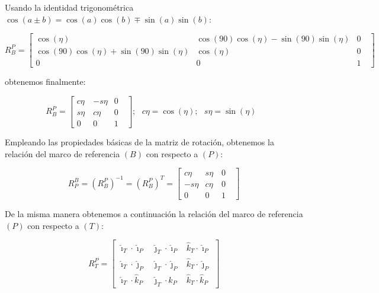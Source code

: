 Usando la identidad trigonom\'{e}trica $\cos (a\pm b)=\cos (a)\cos (b)\mp \sin
(a)\sin (b)$:

\begin{equation*}
R_{B}^{P}=\left[ 
\begin{array}{ccc}
\cos (\eta )\text{ \ \ \ \ \ \ \ } & \cos (90)\cos (\eta )-\sin (90)\sin
(\eta ) & 0 \\ 
\cos (90)\cos (\eta )+\sin (90)\sin (\eta ) & \cos (\eta )\text{ \ \ \ \ \ \ 
} & 0 \\ 
0\text{\ \ \ } & 0\text{\ \ } & 1\text{ }%
\end{array}%
\right]
\end{equation*}

obtenemos finalmente:

\begin{equation}
R_{B}^{P}=\left[ 
\begin{array}{ccc}
c\eta & -s\eta & 0 \\ 
s\eta & c\eta & 0 \\ 
0\text{\ \ \ } & 0\text{\ \ } & 1\text{ }%
\end{array}%
\right] ;\text{ \ \ \ \ }c\eta =\cos (\eta );\text{ }s\eta =\sin (\eta )%
\text{\ \ }
\label{eq:R_P_B}
\end{equation}

Empleando las propiedades b\'{a}sicas de la matriz de rotaci\'{o}n,
obtenemos la relaci\'{o}n del marco de referencia $\left( B\right) $ con
respecto a $\left( P\right) $:

\begin{equation}
R_{P}^{B}=\left( R_{B}^{P}\right) ^{-1}=\left( R_{B}^{P}\right) ^{T}=\left[ 
\begin{array}{ccc}
c\eta & s\eta & 0 \\ 
-s\eta & c\eta & 0 \\ 
0\text{\ \ \ } & 0\text{\ \ } & 1\text{ }%
\end{array}%
\right]
\label{eq:R_B_P}
\end{equation}

De la misma manera obtenemos a continuaci\'{o}n la relaci\'{o}n del marco de
referencia $\left( P\right) $ con respecto a $\left( T\right) $:

\begin{equation*}
R_{T}^{P}=\left[ 
\begin{array}{ccc}
\hat{\imath}_{T}\cdot \hat{\imath}_{P} & \hat{\jmath}_{T}\cdot \hat{\imath}%
_{P} & \hat{k}_{T}\cdot \hat{\imath}_{P} \\ 
\hat{\imath}_{T}\cdot \hat{\jmath}_{P} & \hat{\jmath}_{T}\cdot \hat{\jmath}%
_{P} & \hat{k}_{T}\cdot \hat{\jmath}_{P} \\ 
\hat{\imath}_{T}\cdot \hat{k}_{P} & \hat{\jmath}_{T}\cdot \hat{k}_{P}
& \hat{k}_{T}\cdot \hat{k}_{P}%
\end{array}%
\right]
\end{equation*}


